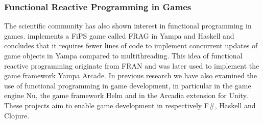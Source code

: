 \subsubsection{Functional Reactive Programming in Games}
The scientific community has also shown interest in functional programming in games. \cite{cheong2005functional} implements a \gls{FiPS} game called FRAG in Yampa and Haskell and concludes that it requires fewer lines of code to implement concurrent updates of game objects in Yampa compared to multithreading. This idea of functional reactive programming originate from FRAN\cite{ElliottHudak97:Fran} and was later used to implement the game framework Yampa Arcade\cite{courtney2003yampa}. In previous research we have also examined the use of functional programming in game development\cite{p92018gameplay}, in particular in the game engine Nu, the game framework Helm and in the Arcadia extension for Unity. These projects aim to enable game development in respectively F\#, Haskell and Clojure.